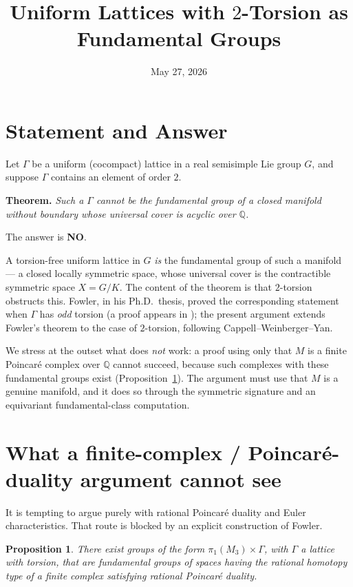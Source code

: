 \documentclass[11pt]{article}
\title{Uniform Lattices with $2$-Torsion as Fundamental Groups}
\author{}
\date{May 27, 2026}
\newcommand{\Q}{\mathbb{Q}}
\newtheorem{proposition}{Proposition}
\begin{document}
\maketitle

\section*{Statement and Answer}

Let $\Gamma$ be a uniform (cocompact) lattice in a real semisimple Lie group
$G$, and suppose $\Gamma$ contains an element of order $2$.

\medskip
\noindent\textbf{Theorem.} \emph{Such a $\Gamma$ cannot be the fundamental group
of a closed manifold without boundary whose universal cover is acyclic over
$\Q$.}

\medskip
\noindent The answer is \textbf{NO}.

\medskip
A torsion-free uniform lattice in $G$ \emph{is} the fundamental group of such a
manifold --- a closed locally symmetric space, whose universal cover is the
contractible symmetric space $X=G/K$. The content of the theorem is that
$2$-torsion obstructs this. Fowler, in his Ph.D.\ thesis, proved the
corresponding statement when $\Gamma$ has \emph{odd} torsion (a proof appears in
\cite{W2}); the present argument extends Fowler's theorem to the case of
$2$-torsion, following Cappell--Weinberger--Yan.

We stress at the outset what does \emph{not} work: a proof using only that $M$
is a finite Poincar\'e complex over $\Q$ cannot succeed, because such complexes
with these fundamental groups exist (Proposition~\ref{prop:counterexample}). The
argument must use that $M$ is a genuine manifold, and it does so through the
symmetric signature and an equivariant fundamental-class computation.

\section*{What a finite-complex / Poincar\'e-duality argument cannot see}

It is tempting to argue purely with rational Poincar\'e duality and Euler
characteristics. That route is blocked by an explicit construction of Fowler.

\begin{proposition}\label{prop:counterexample}
There exist groups of the form $\pi_1(M_3)\times\Gamma$, with $\Gamma$ a lattice
with torsion, that are fundamental groups of spaces having the rational homotopy
type of a finite complex satisfying rational Poincar\'e duality.
\end{proposition}
\end{document}
